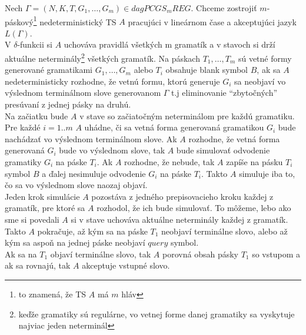 \begin{dokaz}
Nech $\Gamma=(N,K,T,G_1,\dots ,G_m)\in dagPCGS_mREG$. Chceme
zostrojiť $m$-páskový\footnote{to znamená, že TS $A$ má $m$ hláv}
nedeterministický TS $A$ pracujúci v lineárnom čase a akceptujúci
jazyk $L(\Gamma)$.
\\ V $\delta$-funkcii si $A$ uchováva pravidlá všetkých m gramatík
a v stavoch si drží aktuálne neterminály\footnote{keďže gramatiky
sú regulárne, vo vetnej forme danej gramatiky sa vyskytuje najviac
jeden neterminál} všetkých gramatík. Na páskach $T_1,\dots ,T_m$
sú vetné formy generované gramatikami $G_1,\dots ,G_m$ alebo $T_i$
obsahuje blank symbol $B$, ak sa $A$ nedeterministicky rozhodne,
že vetnú formu, ktorú generuje $G_i$ sa neobjaví vo výslednom
terminálnom slove generovanom $\Gamma$ t.j eliminovanie
\mbox{``zbytočných''} presúvaní z jednej pásky na druhú.
\\ Na začiatku bude $A$ v stave so začiatočným neterminálom pre
každú gramatiku. Pre každé $i=1..m$ $A$ uhádne, či sa vetná forma
generovaná gramatikou $G_i$ bude nachádzať vo výslednom
terminálnom slove. Ak $A$ rozhodne, že vetná forma generovaná
$G_i$ bude vo výslednom slove, tak $A$ bude simulovať odvodenie
gramatiky $G_i$ na páske $T_i$. Ak $A$ rozhodne, že nebude, tak
$A$ zapíše na pásku $T_i$ symbol $B$ a ďalej nesimuluje odvodenie
$G_i$ na páske $T_i$. Takto $A$ simuluje iba to, čo sa vo
výslednom slove naozaj objaví.
\\ Jeden krok simulácie $A$ pozostáva z jedného prepisovacieho kroku
každej z gramatík, pre ktoré sa $A$ rozhodol, že ich bude
simulovať. To môžeme, lebo ako sme si povedali $A$ si v stave
uchováva aktuálne neterminály každej z gramatík. Takto $A$
pokračuje, až kým sa na páske $T_1$ neobjaví terminálne slovo,
alebo až kým sa aspoň na jednej páske neobjaví $query$ symbol. \\
Ak sa na $T_1$ objaví terminálne slovo, tak $A$ porovná obsah
pásky $T_1$ so vstupom a ak sa rovnajú, tak $A$ akceptuje vstupné
slovo.


\end{dokaz}

